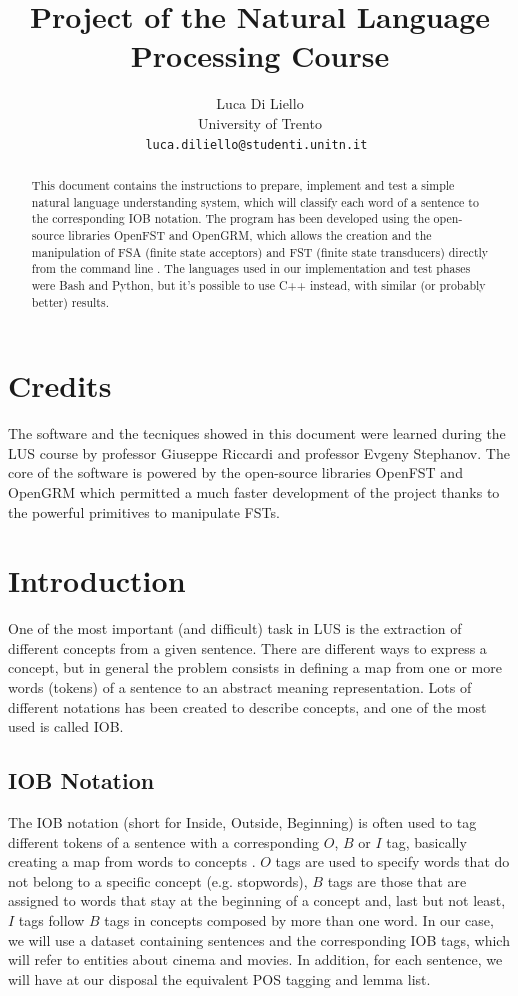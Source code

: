 \documentclass[11pt,a4paper]{article}
\title{Project of the Natural Language Processing Course}
\author{Luca Di Liello \\
	University of Trento\\
    {\tt luca.diliello@studenti.unitn.it }  
}
\begin{document}
\maketitle

\begin{abstract}

This document contains the instructions to prepare, implement and test a simple natural language understanding system, which will classify each word of a sentence to the corresponding IOB notation. The program has been developed using the open-source libraries OpenFST and OpenGRM, which allows the creation and the manipulation of FSA (finite state acceptors) and FST (finite state transducers) directly from the command line \cite{openfst} \cite{opengrm}. The languages used in our implementation and test phases were Bash and Python, but it's possible to use C++ instead, with similar (or probably better) results.

\end{abstract}

\section{Credits}

The software and the tecniques showed in this document were learned during the LUS course by professor Giuseppe Riccardi and professor Evgeny Stephanov. The core of the software is powered by the open-source libraries OpenFST and OpenGRM which permitted a much faster development of the project thanks to the powerful primitives to manipulate FSTs.

\section{Introduction}

One of the most important (and difficult) task in LUS is the extraction of different concepts from a given sentence. There are different ways to express a concept, but in general the problem consists in defining a map from one or more words (tokens) of a sentence to an abstract meaning representation. Lots of different notations has been created to describe concepts, and one of the most used is called IOB.

\subsection{IOB Notation}

The IOB notation (short for Inside, Outside, Beginning) is often used to tag different tokens of a sentence with a corresponding $O$, $B$ or $I$ tag, basically creating a map from words to concepts \cite{iob_notation}. $O$ tags are used to specify words that do not belong to a specific concept (e.g. stopwords), $B$ tags are those that are assigned to words that stay at the beginning of a concept and, last but not least, $I$ tags follow $B$ tags in concepts composed by more than one word. In our case, we will use a dataset containing sentences and the corresponding IOB tags, which will refer to entities about cinema and movies. In addition, for each sentence, we will have at our disposal the equivalent POS tagging and lemma list.
\end{document}

